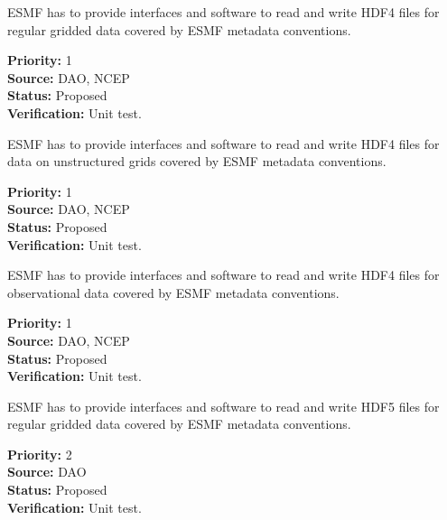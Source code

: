 
ESMF has to provide interfaces and software to read and write HDF4 files for 
regular gridded data covered by ESMF metadata conventions.
 

\begin{reqlist}
{\bf Priority:} 1 \\
{\bf Source:} DAO, NCEP \\
{\bf Status:} Proposed \\
{\bf Verification:} Unit test. \\
\end{reqlist}




ESMF has to provide interfaces and software to read and write HDF4
files for data on unstructured grids covered by ESMF metadata conventions.
 

\begin{reqlist}
{\bf Priority:} 1 \\
{\bf Source:} DAO, NCEP \\
{\bf Status:} Proposed \\
{\bf Verification:} Unit test. \\
\end{reqlist}




ESMF has to provide interfaces and software to read and write HDF4
files for observational data  covered by ESMF metadata conventions.
 

\begin{reqlist}
{\bf Priority:} 1 \\
{\bf Source:} DAO, NCEP \\
{\bf Status:} Proposed \\
{\bf Verification:} Unit test. \\
\end{reqlist}





ESMF has to provide interfaces and software to read and write HDF5
files for regular gridded data covered by ESMF metadata conventions.

\begin{reqlist}
{\bf Priority:} 2 \\
{\bf Source:} DAO \\
{\bf Status:} Proposed \\
{\bf Verification:} Unit test. 
\end{reqlist}



